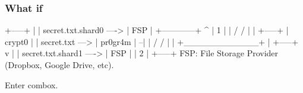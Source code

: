 \begin{frame}[fragile]
  \frametitle{What if}

  {\tiny
  \begin{semiverbatim}
                                                             +-----+
                                                             |     |
                                  secret.txt.shard0   ---->  | FSP |
                   +------------+   ^                        |  1  |
                   |  /     /   |   |                        +-----+
                   |  crypt0    |   |
   secret.txt ---> |  pr0gr4m   | --|
                   | /     /    |   |
                   +____________+   |                        +-----+
                                    v                        |     |
                                  secret.txt.shard1   ---->  | FSP |
                                                             |  2  |
                                                             +-----+
FSP: File Storage Provider (Dropbox, Google Drive, etc).
  \end{semiverbatim}
  }

\end{frame}

\begin{frame}
  \centering
  Enter combox.
\end{frame}
